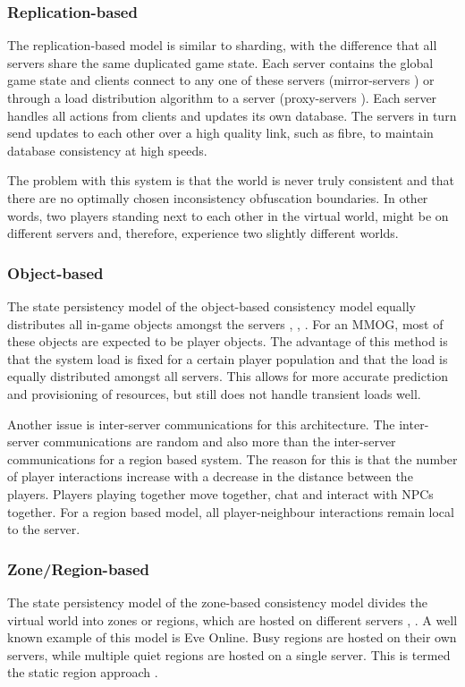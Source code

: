 \documentclass[10pt,a4paper,journal,cspaper,compsoc]{IEEEtran}
\begin{document}
\subsubsection{Replication-based}
The replication-based model is similar to sharding, with the difference that all servers share the same duplicated game state. Each server contains
the global game state and clients connect to any one of these servers (mirror-servers \cite{mirrored_server}) or through a load distribution
algorithm to a server (proxy-servers \cite{proxy_server_dist}). Each server handles all actions from clients and updates its own database. The
servers in turn send updates to each other over a high quality link, such as fibre, to maintain database consistency at high speeds.

The problem with this system is that the world is never truly consistent and that there are no optimally chosen inconsistency obfuscation boundaries.
In other words, two players standing next to each other in the virtual world, might be on different servers and, therefore, experience two slightly
different worlds.

\subsubsection{Object-based}
The state persistency model of the object-based consistency model equally distributes all in-game objects amongst the servers
\cite{object_based_consistency1}, \cite{object_based_consistency2}, \cite{object_based_consistency3}. For an MMOG, most of these objects are expected
to be player objects. The advantage of this method is that the system load is fixed for a certain player population and that the load is equally
distributed amongst all servers. This allows for more accurate prediction and provisioning of resources, but still does not handle transient loads
well.

Another issue is inter-server communications for this architecture. The inter-server communications are random and also more than the inter-server
communications for a region based system. The reason for this is that the number of player interactions increase with a decrease in the distance
between the players. Players playing together move together, chat and interact with NPCs together. For a region based model, all player-neighbour
interactions remain local to the server.

\subsubsection{Zone/Region-based}
The state persistency model of the zone-based consistency model divides the virtual world into zones or regions, which are hosted on different
servers \cite{zone_based_stat}, \cite{zone_based_dyn}. A well known example of this model is Eve Online. Busy regions are hosted on their own
servers, while multiple quiet regions are hosted on a single server. This is termed the static region approach \cite{zone_based_stat}.
\end{document}

